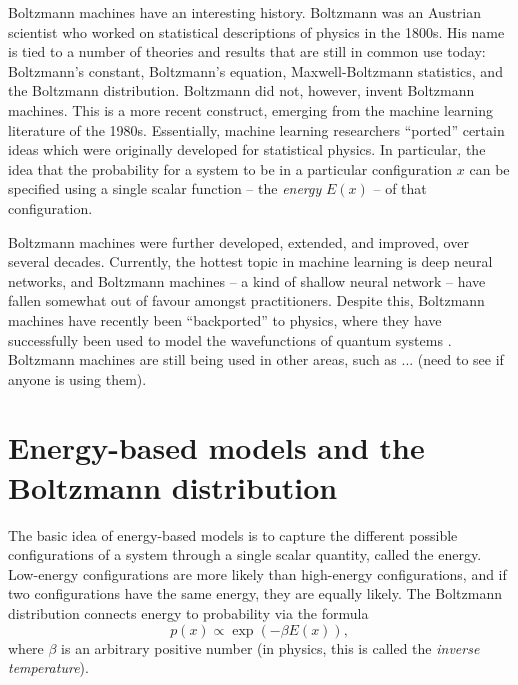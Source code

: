 \documentclass[a4paper]{article}
\begin{document}

Boltzmann machines have an interesting history. Boltzmann was an Austrian scientist who worked on statistical descriptions of physics in the 1800s. His name is tied to a number of theories and results that are still in common use today: Boltzmann's constant, Boltzmann's equation, Maxwell-Boltzmann statistics, and the Boltzmann distribution. Boltzmann did not, however, invent Boltzmann machines. This is a more recent construct, emerging from the machine learning literature of the 1980s. Essentially, machine learning researchers ``ported'' certain ideas which were originally developed for statistical physics. In particular, the idea that the probability for a system to be in a particular configuration $x$ can be specified using a single scalar function -- the \emph{energy} $E(x)$ -- of that configuration. 

Boltzmann machines were further developed, extended, and improved, over several decades. Currently, the hottest topic in machine learning is deep neural networks, and Boltzmann machines -- a kind of shallow neural network -- have fallen somewhat out of favour amongst practitioners. Despite this, Boltzmann machines have recently been ``backported'' to physics, where they have successfully been used to model the wavefunctions of quantum systems \cite{...}. Boltzmann machines are still being used in other areas, such as ... (need to see if anyone is using them).

\section{Energy-based models and the Boltzmann distribution}

The basic idea of energy-based models is to capture the different possible configurations of a system through a single scalar quantity, called the energy. Low-energy configurations are more likely than high-energy configurations, and if two configurations have the same energy, they are equally likely. The Boltzmann distribution connects energy to probability via the formula
\begin{equation}
 p(x) \propto \exp(-\beta E(x)),
\end{equation}
where $\beta$ is an arbitrary positive number (in physics, this is called the \emph{inverse temperature}). 
\end{document}

